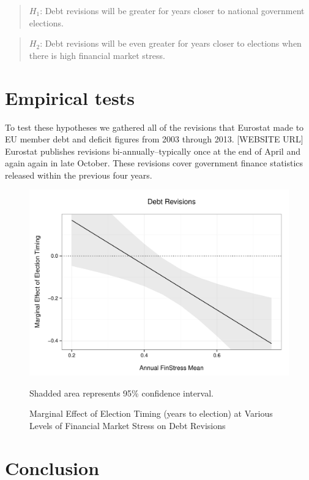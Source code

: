 \documentclass[]{article}
\begin{document}
\begin{quote}
    $H_{1}$: Debt revisions will be greater for years closer to national government elections.
\end{quote}

\begin{quote}
    $H_{2}$: Debt revisions will be even greater for years closer to elections when there is high financial market stress.
\end{quote}

\section{Empirical tests}

To test these hypotheses we gathered all of the revisions that Eurostat made to EU member debt and deficit figures from 2003 through 2013. [WEBSITE URL] Eurostat publishes revisions bi-annually--typically once at the end of April and again again in late October. These revisions cover government finance statistics released within the previous four years.

\begin{figure}
    \caption{Marginal Effect of Election Timing (years to election) at Various Levels of Financial Market Stress on Debt Revisions}
    \label{me_finstress_elect}

    \begin{center}
        \includegraphics[scale=0.6]{figures/finstress_elect_me.pdf}
    \end{center}

{\scriptsize{Shadded area represents 95\% confidence interval.}}

\end{figure}


\section{Conclusion}


\clearpage



\end{document}
